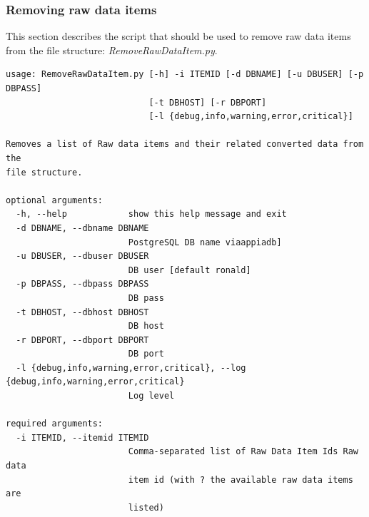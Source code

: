 \subsubsection{Removing raw data items}
\label{sec:removeraw}
This section describes the script that should be used to remove raw data items from the file structure: \textit{RemoveRawDataItem.py}.
\begin{Verbatim}[fontfamily=courier,commandchars=\\\{\},fontsize=\footnotesize]
usage: RemoveRawDataItem.py [-h] -i ITEMID [-d DBNAME] [-u DBUSER] [-p DBPASS]
                            [-t DBHOST] [-r DBPORT]
                            [-l {debug,info,warning,error,critical}]

Removes a list of Raw data items and their related converted data from the
file structure.

optional arguments:
  -h, --help            show this help message and exit
  -d DBNAME, --dbname DBNAME
                        PostgreSQL DB name viaappiadb]
  -u DBUSER, --dbuser DBUSER
                        DB user [default ronald]
  -p DBPASS, --dbpass DBPASS
                        DB pass
  -t DBHOST, --dbhost DBHOST
                        DB host
  -r DBPORT, --dbport DBPORT
                        DB port
  -l {debug,info,warning,error,critical}, --log {debug,info,warning,error,critical}
                        Log level

required arguments:
  -i ITEMID, --itemid ITEMID
                        Comma-separated list of Raw Data Item Ids Raw data
                        item id (with ? the available raw data items are
                        listed)
\end{Verbatim}

